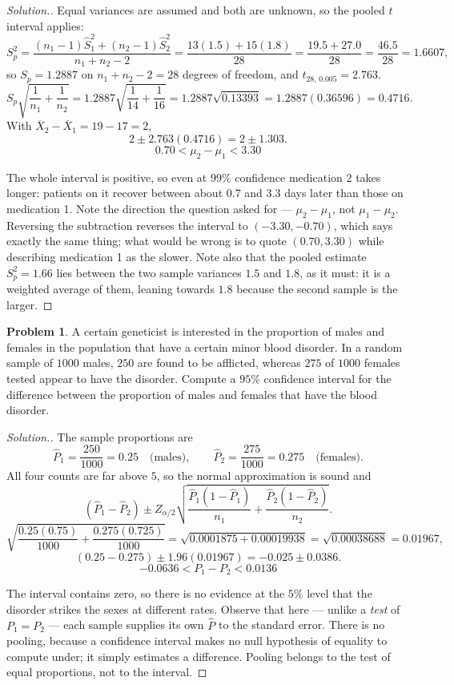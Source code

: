 \documentclass[11pt,a4paper]{article}
\theoremstyle{definition}
\newtheorem{problemx}{Problem}[section]
\newenvironment{problem}{\begin{problemx}}{\end{problemx}}
\newenvironment{solution}
  {\renewcommand{\qedsymbol}{}\begin{proof}[\textit{Solution}.]}
  {\end{proof}}
\begin{document}
\begin{solution}
Equal variances are assumed and both are unknown, so the pooled $t$ interval applies:
\[S_p^2=\frac{(n_1-1)\hat{S}_1^2+(n_2-1)\hat{S}_2^2}{n_1+n_2-2}
=\frac{13(1.5)+15(1.8)}{28}=\frac{19.5+27.0}{28}=\frac{46.5}{28}=1.6607,\]
so $S_p=1.2887$ on $n_1+n_2-2=28$ degrees of freedom, and $t_{28,\,0.005}=2.763$.
\[S_p\sqrt{\frac{1}{n_1}+\frac{1}{n_2}}=1.2887\sqrt{\frac{1}{14}+\frac{1}{16}}
=1.2887\sqrt{0.13393}=1.2887(0.36596)=0.4716.\]
With $\overline{X}_2-\overline{X}_1=19-17=2$,
\[2\pm 2.763(0.4716)=2\pm 1.303.\]
\[0.70<\mu_2-\mu_1<3.30\]

The whole interval is positive, so even at $99\%$ confidence medication 2 takes longer:
patients on it recover between about $0.7$ and $3.3$ days later than those on medication 1.
Note the direction the question asked for --- $\mu_2-\mu_1$, not $\mu_1-\mu_2$. Reversing
the subtraction reverses the interval to $(-3.30,-0.70)$, which says exactly the same thing;
what would be wrong is to quote $(0.70,3.30)$ while describing medication 1 as the slower.
Note also that the pooled estimate $S_p^2=1.66$ lies between the two sample variances $1.5$
and $1.8$, as it must: it is a weighted average of them, leaning towards $1.8$ because the
second sample is the larger.
\end{solution}

\begin{problem}
A certain geneticist is interested in the proportion of males and females in the population
that have a certain minor blood disorder. In a random sample of $1000$ males, $250$ are
found to be afflicted, whereas $275$ of $1000$ females tested appear to have the disorder.
Compute a $95\%$ confidence interval for the difference between the proportion of males and
females that have the blood disorder.
\end{problem}

\begin{solution}
The sample proportions are
\[\hat{P}_1=\frac{250}{1000}=0.25\quad\text{(males)},\qquad
\hat{P}_2=\frac{275}{1000}=0.275\quad\text{(females)}.\]
All four counts are far above $5$, so the normal approximation is sound and
\[(\hat{P}_1-\hat{P}_2)\pm Z_{\alpha/2}
\sqrt{\frac{\hat{P}_1(1-\hat{P}_1)}{n_1}+\frac{\hat{P}_2(1-\hat{P}_2)}{n_2}}.\]
\[\sqrt{\frac{0.25(0.75)}{1000}+\frac{0.275(0.725)}{1000}}
=\sqrt{0.0001875+0.00019938}=\sqrt{0.00038688}=0.01967,\]
\[(0.25-0.275)\pm 1.96(0.01967)=-0.025\pm 0.0386.\]
\[-0.0636<P_1-P_2<0.0136\]

The interval contains zero, so there is no evidence at the $5\%$ level that the disorder
strikes the sexes at different rates. Observe that here --- unlike a \emph{test} of
$P_1=P_2$ --- each sample supplies its own $\hat{P}$ to the standard error. There is no
pooling, because a confidence interval makes no null hypothesis of equality to compute
under; it simply estimates a difference. Pooling belongs to the test of equal proportions, not to the
interval.
\end{solution}
\end{document}
